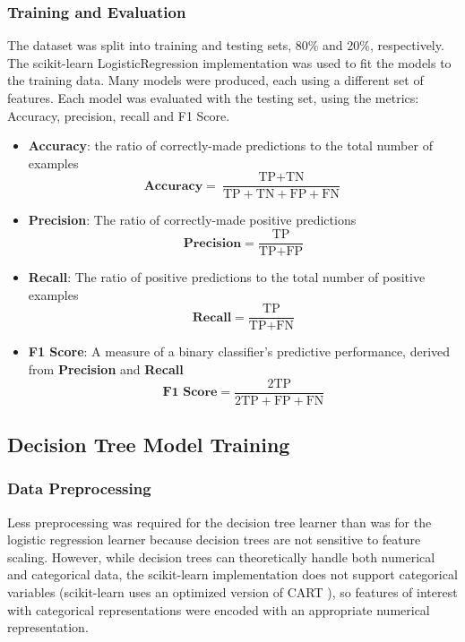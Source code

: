 \documentclass[12pt]{article}
\begin{document}
\subsubsection{Training and Evaluation}

The dataset was split into training and testing sets, 80\% and 20\%, respectively. The scikit-learn LogisticRegression implementation was used to fit the models to the training data. Many models were produced, each using a different set of features. Each model was evaluated with the testing set, using the metrics: Accuracy, precision, recall and F1 Score.

\begin{itemize}[label={}, leftmargin=0pt]
  \item \textbf{Accuracy}: the ratio of correctly-made predictions to the total number of examples
\[
    \textbf{Accuracy} = \frac{\text{TP} + \text{TN}}{\text{TP} + \text{TN} + \text{FP} + \text{FN}}
\]
  \item \textbf{Precision}: The ratio of correctly-made positive predictions
\[
    \textbf{Precision} = \frac{\text{TP}}{\text{TP} + \text{FP}}
\]
  \item \textbf{Recall}: The ratio of positive predictions to the total number of positive examples
\[
    \textbf{Recall} = \frac{\text{TP}}{\text{TP} + \text{FN}}
\]
  \item \textbf{F1 Score}: A measure of a binary classifier's predictive performance, derived from \textbf{Precision} and \textbf{Recall}
\[
    \textbf{F1 Score} = \frac{2\text{TP}}{2\text{TP} + \text{FP} + \text{FN}}
\]
\end{itemize}

\subsection{Decision Tree Model Training}

\subsubsection{Data Preprocessing}
Less preprocessing was required for the decision tree learner than was for the logistic regression learner because decision trees are not sensitive to feature scaling. However, while decision trees can theoretically handle both numerical and categorical data, the scikit-learn implementation does not support categorical variables \cite{sklearnDT} (scikit-learn uses an optimized version of CART \cite{classificationTrees1984}), so features of interest with categorical representations were encoded with an appropriate numerical representation.
\end{document}
